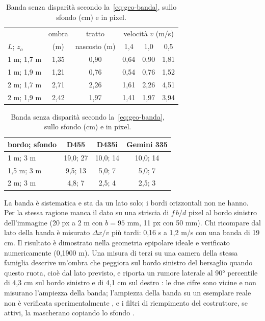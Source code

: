 \begin{table}[htb]\small
\begin{minipage}[t]{0.52\textwidth}\centering
\caption{Durata dell'occlusione totale $T_{\mathrm{tot}}$ (s) secondo la~\eqref{eq:geo-durata}, con $z_p=2{,}3$ m e $w_c=0{,}45$ m. }\label{tab:geo-durata}
\begin{tabular}{@{}lccccc@{}}
\toprule
 & ombra & tratto & \multicolumn{3}{c}{velocità $v$ (m/s)}\\
$L$; $z_o$ & (m) & nascosto (m) & 1,4 & 1,0 & 0,5\\
\midrule
1 m; 1,7 m & 1,35 & 0,90 & 0,64 & 0,90 & 1,81\\
1 m; 1,9 m & 1,21 & 0,76 & 0,54 & 0,76 & 1,52\\
2 m; 1,7 m & 2,71 & 2,26 & 1,61 & 2,26 & 4,51\\
2 m; 1,9 m & 2,42 & 1,97 & 1,41 & 1,97 & 3,94\\
\bottomrule
\end{tabular}
\end{minipage}\hfill
\begin{minipage}[t]{0.45\textwidth}\centering
\caption{Banda senza disparità secondo la~\eqref{eq:geo-banda}, sullo sfondo (cm) e in pixel. }\label{tab:geo-banda}
\begin{tabular}{@{}lccc@{}}
\toprule
bordo; sfondo & D455 & D435i & Gemini 335\\
\midrule
1 m; 3 m & 19,0; 27 & 10,0; 14 & 10,0; 14\\
1,5 m; 3 m & 9,5; 13 & 5,0; 7 & 5,0; 7\\
2 m; 3 m & 4,8; 7 & 2,5; 4 & 2,5; 3\\
\bottomrule
\end{tabular}
\end{minipage}
\end{table}

La banda è sistematica e sta da un lato solo; i bordi orizzontali non ne hanno. Per la stessa ragione manca il dato su una striscia di $f\,b/d$ pixel al bordo sinistro dell'immagine (20 px a 2 m con $b=95$ mm, 11 px con 50 mm). Chi ricompare dal lato della banda è misurato $\Delta x/v$ più tardi: 0,16 s a 1,2 m/s con una banda di 19 cm. Il risultato è dimostrato nella geometria epipolare ideale e verificato numericamente (0,1900 m). Una misura di terzi su una camera della stessa famiglia descrive un'ombra che peggiora sul bordo sinistro del bersaglio quando questo ruota, cioè dal lato previsto, e riporta un rumore laterale al 90° percentile di 4,3 cm sul bordo sinistro e di 4,1 cm sul destro \cite{ahn2019}: le due cifre sono vicine e non misurano l'ampiezza della banda; l'ampiezza della banda su un esemplare reale non è verificata sperimentalmente , e i filtri di riempimento del costruttore, se attivi, la mascherano copiando lo sfondo \cite{realsense-filtri-post}.

